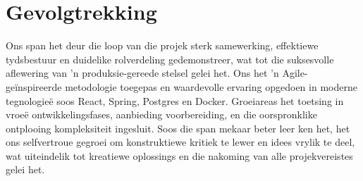 \section{Gevolgtrekking}

Ons span het deur die loop van die projek sterk samewerking, effektiewe
tydsbestuur en duidelike rolverdeling gedemonstreer, wat tot die
suksesvolle aflewering van 'n produksie-gereede stelsel gelei het.
Ons het 'n Agile-geïnspireerde metodologie toegepas en waardevolle
ervaring opgedoen in moderne tegnologieë soos React,
Spring, Postgres en Docker. Groeiareas het toetsing in
vroeë ontwikkelingsfases, aanbieding voorbereiding,
en die oorspronklike ontplooing kompleksiteit ingesluit.
Soos die span mekaar beter leer ken het, het ons selfvertroue
gegroei om konstruktiewe kritiek te lewer en idees
vrylik te deel, wat uiteindelik tot kreatiewe oplossings
en die nakoming van alle projekvereistes gelei het.
